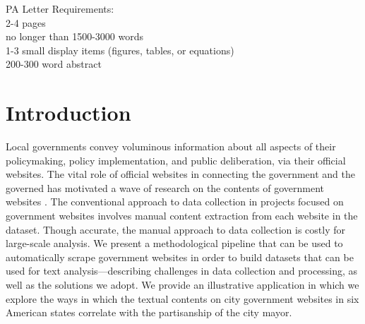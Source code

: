\documentclass[11pt]{article}
\begin{document}
\noindent PA Letter Requirements:\\
2-4 pages\\
no longer than 1500-3000 words\\
1-3 small display items (figures, tables, or equations)\\
200-300 word abstract\\

\section{Introduction}
Local governments convey voluminous information about all aspects of their policymaking, policy implementation, and public deliberation, via their official websites. The vital role of official websites in connecting the government and the governed has motivated a wave of research on the contents of government websites \citep[e.g.,][]{grimmelikhuijsen2010transparency,wang2005evaluating,osman2014cobra,Eschenfelder2002}. The conventional approach to data collection in projects focused on government websites involves manual content extraction from each website in the dataset. Though accurate, the manual approach to data collection is costly for large-scale analysis. We present a methodological pipeline that can be used to automatically scrape government websites in order to build datasets that can be used for text analysis---describing challenges in data collection and processing, as well as the solutions we adopt. We provide an illustrative application in which we explore the ways in which the textual contents on city government websites in six American states correlate with the partisanship of the city mayor.

\end{document}
